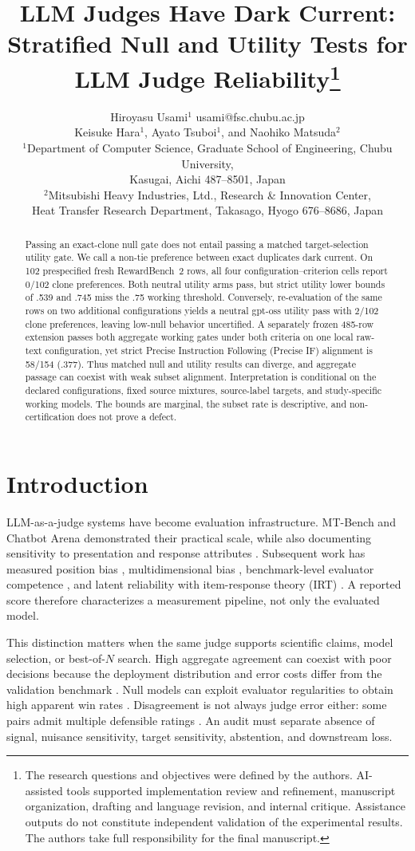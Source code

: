 \documentclass[10pt]{article}
\title{LLM Judges Have Dark Current:\\Stratified Null and Utility Tests for LLM Judge Reliability\thanks{The research questions and objectives were defined by the authors. AI-assisted tools supported implementation review and refinement, manuscript organization, drafting and language revision, and internal critique. Assistance outputs do not constitute independent validation of the experimental results. The authors take full responsibility for the final manuscript.}}
\author{\name Hiroyasu Usami$^1$ \email usami@fsc.chubu.ac.jp \\
\name Keisuke Hara$^1$, Ayato Tsuboi$^1$, and Naohiko Matsuda$^2$ \\
\addr $^1$Department of Computer Science, Graduate School of Engineering, Chubu University,\\
Kasugai, Aichi 487--8501, Japan\\
\addr $^2$Mitsubishi Heavy Industries, Ltd., Research \& Innovation Center,\\
Heat Transfer Research Department, Takasago, Hyogo 676--8686, Japan}
\date{}
\begin{document}
\maketitle

\begin{abstract}
Passing an exact-clone null gate does not entail passing a matched target-selection utility gate. We call a non-tie preference between exact duplicates dark current. On 102 prespecified fresh RewardBench~2 rows, all four configuration--criterion cells report 0/102 clone preferences. Both neutral utility arms pass, but strict utility lower bounds of .539 and .745 miss the .75 working threshold. Conversely, re-evaluation of the same rows on two additional configurations yields a neutral gpt-oss utility pass with 2/102 clone preferences, leaving low-null behavior uncertified. A separately frozen 485-row extension passes both aggregate working gates under both criteria on one local raw-text configuration, yet strict Precise Instruction Following (Precise IF) alignment is 58/154 (.377). Thus matched null and utility results can diverge, and aggregate passage can coexist with weak subset alignment. Interpretation is conditional on the declared configurations, fixed source mixtures, source-label targets, and study-specific working models. The bounds are marginal, the subset rate is descriptive, and non-certification does not prove a defect.
\end{abstract}

\section{Introduction}

LLM-as-a-judge systems have become evaluation infrastructure. MT-Bench and Chatbot Arena demonstrated their practical scale, while also documenting sensitivity to presentation and response attributes \citep{zheng2023mtbench}. Subsequent work has measured position bias \citep{shi2025positionbias}, multidimensional bias \citep{ye2025justice}, benchmark-level evaluator competence \citep{wang2025dhp}, and latent reliability with item-response theory (IRT) \citep{choi2026irt}. A reported score therefore characterizes a measurement pipeline, not only the evaluated model.

This distinction matters when the same judge supports scientific claims, model selection, or best-of-$N$ search. High aggregate agreement can coexist with poor decisions because the deployment distribution and error costs differ from the validation benchmark \citep{landesberg2026causal,landesberg2026bestofn}. Null models can exploit evaluator regularities to obtain high apparent win rates \citep{zheng2025null}. Disagreement is not always judge error either: some pairs admit multiple defensible ratings \citep{guerdan2025indeterminacy}. An audit must separate absence of signal, nuisance sensitivity, target sensitivity, abstention, and downstream loss.
\end{document}
